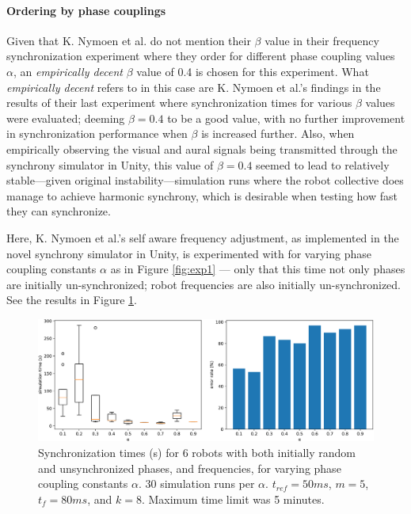 		\paragraph{Ordering by phase couplings}
		Given that K. Nymoen et al. do not mention their $\beta$ value in their frequency synchronization experiment where they order for different phase coupling values $\alpha$, an \textit{empirically decent} $\beta$ value of 0.4 is chosen for this experiment. What \textit{empirically decent} refers to in this case are K. Nymoen et al.'s findings in the results of their last experiment \cite{nymoen_synch} where synchronization times for various $\beta$ values were evaluated; deeming $\beta=0.4$ to be a good value, with no further improvement in synchronization performance when $\beta$ is increased further. Also, when empirically observing the visual and aural signals being transmitted through the synchrony simulator in Unity, this value of $\beta=0.4$ seemed to lead to relatively stable—given original instability—simulation runs where the robot collective does manage to achieve harmonic synchrony, which is desirable when testing how fast they can synchronize.
		
		Here, K. Nymoen et al.'s self aware frequency adjustment, as implemented in the novel synchrony simulator in Unity, is experimented with for varying phase coupling constants $\alpha$ as in Figure \ref{fig:exp1} — only that this time not only phases are initially un-synchronized; robot frequencies are also initially un-synchronized. See the results in Figure \ref{fig:exp2}.
		
		\begin{figure}[ht!]
			\centering
			\includegraphics[width=\linewidth]{Assets/DocSegments/Chapters/ExperimentsAndResults/Figures/PerfScores/experiment2_perfScores.pdf}
			\caption{Synchronization times (s) for 6 robots with both initially random and unsynchronized phases, and frequencies, for varying phase coupling constants $\alpha$. 30 simulation runs per $\alpha$. $t_{ref}=50ms$, $m=5$, $t_f=80ms$, and $k=8$. Maximum time limit was 5 minutes.}
			\label{fig:exp2}
		\end{figure}
		
